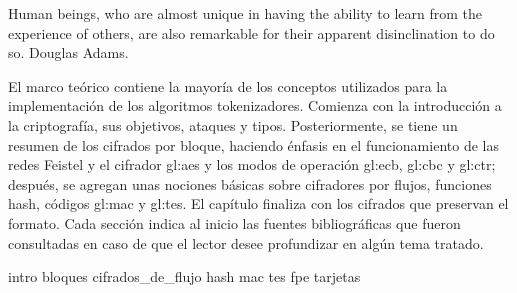 %
%

\label{sec:marco_teorico}
{%
  Human beings, who are almost unique in having the ability to learn from the
  experience of others, are also remarkable for their apparent disinclination
  to do so.%
}
{%
   Douglas Adams.%
}

\noindent
El marco teórico contiene la mayoría de los conceptos utilizados para la
implementación de los algoritmos tokenizadores. Comienza con la introducción a
la criptografía, sus objetivos, ataques y tipos. Posteriormente, se tiene un
resumen de los cifrados por bloque, haciendo énfasis en el funcionamiento de las
redes Feistel y el cifrador \gls{gl:aes} y los modos de operación \gls{gl:ecb},
\gls{gl:cbc} y \gls{gl:ctr}; después, se agregan unas nociones básicas sobre
cifradores por flujos, funciones hash, códigos \gls{gl:mac} y \gls{gl:tes}. El
capítulo finaliza con los cifrados que preservan el formato. Cada sección
indica al inicio las fuentes bibliográficas que fueron consultadas en caso de
que el lector desee profundizar en algún tema tratado.

{intro}
{bloques}
{cifrados_de_flujo}
{hash}
{mac}
{tes}
{fpe}
{tarjetas}
